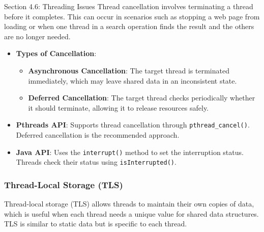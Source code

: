 \begin{notes}{Section 4.6: Threading Issues}
    Thread cancellation involves terminating a thread before it completes. This can occur in scenarios such as stopping a web page from loading or when one thread in a search operation finds the result 
    and the others are no longer needed.
    
    \begin{highlight}
    
        \begin{itemize}
            \item \textbf{Types of Cancellation}:
                \begin{itemize}
                    \item \textbf{Asynchronous Cancellation}: The target thread is terminated immediately, which may leave shared data in an inconsistent state.
                    \item \textbf{Deferred Cancellation}: The target thread checks periodically whether it should terminate, allowing it to release resources safely.
                \end{itemize}
            \item \textbf{Pthreads API}: Supports thread cancellation through \texttt{pthread\_cancel()}. Deferred cancellation is the recommended approach.
            \item \textbf{Java API}: Uses the \texttt{interrupt()} method to set the interruption status. Threads check their status using \texttt{isInterrupted()}.
        \end{itemize}
    
    \end{highlight}
    
    \subsubsection*{Thread-Local Storage (TLS)}
    
    Thread-local storage (TLS) allows threads to maintain their own copies of data, which is useful when each thread needs a unique value for shared data structures. TLS is similar to static data but 
    is specific to each thread.
    
    \begin{highlight}
    

\end{highlight}
\end{notes}
